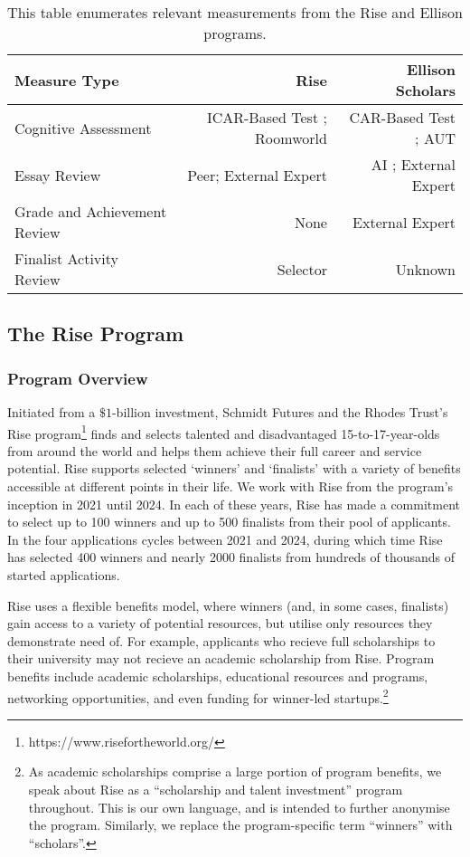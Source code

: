 \begin{table}[htbp]
    \centering
    \caption{This table enumerates relevant measurements from the Rise and Ellison programs.}
    \label{tab:measures}
    \begin{tabular}{l | r r}
        \toprule
        Measure Type & Rise & Ellison Scholars \\
        \midrule
        Cognitive Assessment & ICAR-Based Test \cite{condon2014international}; Roomworld \cite{summerfield} & CAR-Based Test \cite{condon2014international}; AUT \cite{guilford1967creativity,organisciak_beyond_2023} \\
        Essay Review & Peer; External Expert & AI \cite{xiao2024humanaicollaborativeessayscoring}; External Expert \\
        Grade and Achievement Review & None & External Expert \\
        Finalist Activity Review & Selector & Unknown \\
        \bottomrule
    \end{tabular}
  \end{table}
  
\subsection{The Rise Program}\label{ssec:rise}
\subsubsection{Program Overview}
Initiated from a $\$1$-billion investment, Schmidt Futures and the Rhodes Trust's Rise program\footnote{https://www.risefortheworld.org/} finds and selects talented and disadvantaged 15-to-17-year-olds from around the world and helps them achieve their full career and service potential. Rise supports selected `winners' and `finalists' with a variety of benefits accessible at different points in their life. We work with Rise from the program's inception in 2021 until 2024. In each of these years, Rise has made a commitment to select up to 100 winners and up to 500 finalists from their pool of applicants. In the four applications cycles between 2021 and 2024, during which time Rise has selected 400 winners and nearly 2000 finalists from hundreds of thousands of started applications.

Rise uses a flexible benefits model, where winners (and, in some cases, finalists) gain access to a variety of potential resources, but utilise only resources they demonstrate need of. For example, applicants who recieve full scholarships to their university may not recieve an academic scholarship from Rise. Program benefits include academic scholarships, educational resources and programs, networking opportunities, and even funding for winner-led startups.\footnote{As academic scholarships comprise a large portion of program benefits, we speak about Rise as a ``scholarship and talent investment'' program throughout. This is our own language, and is intended to further anonymise the program. Similarly, we replace the program-specific term ``winners'' with ``scholars''.}

